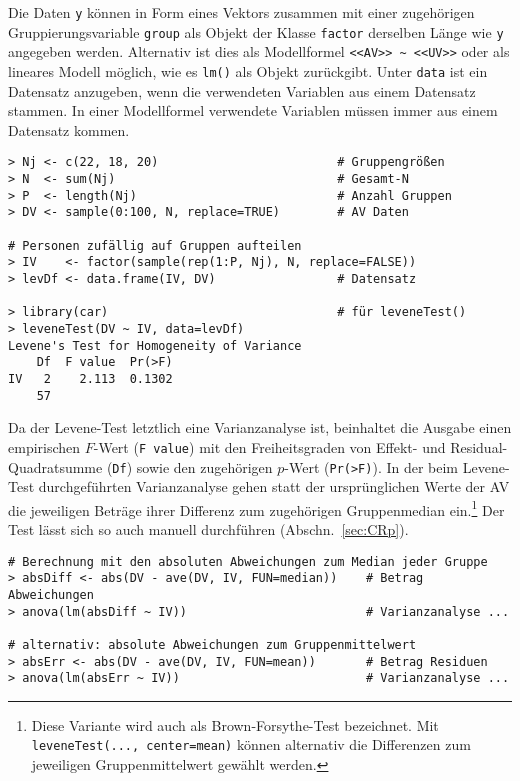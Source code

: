 Die Daten \lstinline!y! können in Form eines Vektors zusammen mit einer zugehörigen Gruppierungsvariable \lstinline!group! als Objekt der Klasse \lstinline!factor! derselben Länge wie \lstinline!y! angegeben werden. Alternativ ist dies als Modellformel \lstinline!<<AV>> ~ <<UV>>! oder als lineares Modell möglich, wie es \lstinline!lm()! als Objekt zurückgibt. Unter \lstinline!data! ist ein Datensatz anzugeben, wenn die verwendeten Variablen aus einem Datensatz stammen. In einer Modellformel verwendete Variablen müssen immer aus einem Datensatz kommen.
\begin{lstlisting}
> Nj <- c(22, 18, 20)                         # Gruppengrößen
> N  <- sum(Nj)                               # Gesamt-N
> P  <- length(Nj)                            # Anzahl Gruppen
> DV <- sample(0:100, N, replace=TRUE)        # AV Daten

# Personen zufällig auf Gruppen aufteilen
> IV    <- factor(sample(rep(1:P, Nj), N, replace=FALSE))
> levDf <- data.frame(IV, DV)                 # Datensatz

> library(car)                                # für leveneTest()
> leveneTest(DV ~ IV, data=levDf)
Levene's Test for Homogeneity of Variance
    Df  F value  Pr(>F)
IV   2    2.113  0.1302
    57
\end{lstlisting}

Da der Levene-Test letztlich eine Varianzanalyse ist, beinhaltet die Ausgabe einen empirischen $F$-Wert (\lstinline!F value!) mit den Freiheitsgraden von Effekt- und Residual-Quadratsumme (\lstinline!Df!) sowie den zugehörigen $p$-Wert (\lstinline!Pr(>F)!). In der beim Levene-Test durchgeführten Varianzanalyse gehen statt der ursprünglichen Werte der AV die jeweiligen Beträge ihrer Differenz zum zugehörigen Gruppenmedian ein.\footnote{Diese Variante wird auch als Brown-Forsythe-Test bezeichnet. Mit \lstinline!leveneTest(..., center=mean)! können alternativ die Differenzen zum jeweiligen Gruppenmittelwert gewählt werden.} Der Test lässt sich so auch manuell durchführen (Abschn.\ \ref{sec:CRp}).
\begin{lstlisting}
# Berechnung mit den absoluten Abweichungen zum Median jeder Gruppe
> absDiff <- abs(DV - ave(DV, IV, FUN=median))    # Betrag Abweichungen
> anova(lm(absDiff ~ IV))                         # Varianzanalyse ...

# alternativ: absolute Abweichungen zum Gruppenmittelwert
> absErr <- abs(DV - ave(DV, IV, FUN=mean))       # Betrag Residuen
> anova(lm(absErr ~ IV))                          # Varianzanalyse ...
\end{lstlisting}

